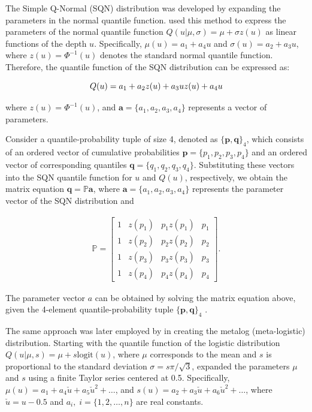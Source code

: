 \documentclass[
  fleqn,
  deca,
  blindrev
]{informs4}
\begin{document}
The Simple Q-Normal (SQN) distribution was developed by expanding the
parameters in the normal quantile function.
\citet{keelin2011QuantileParameterizedDistributions} used this method to
express the parameters of the normal quantile function
\(Q(u\vert\mu,\sigma)=\mu+\sigma z(u)\) as linear functions of the depth
\(u\). Specifically, \(\mu(u)=a_1+a_4u\) and \(\sigma(u)=a_2+a_3u\),
where \(z(u)=\Phi^{-1}(u)\) denotes the standard normal quantile
function. Therefore, the quantile function of the SQN distribution can
be expressed as:

\[
Q(u)= a_1+a_2z(u)+a_3uz(u)+a_4u\\
\]

where \(z(u)=\Phi^{-1}(u)\), and \(\mathbf{a}=\{a_1,a_2,a_3, a_4\}\)
represents a vector of parameters.

Consider a quantile-probability tuple of size 4, denoted as
\(\{\mathbf{p}, \mathbf{q}\}_4\), which consists of an ordered vector of
cumulative probabilities \(\mathbf{p}=\{p_1,p_2,p_3, p_4\}\) and an
ordered vector of corresponding quantiles
\(\mathbf{q}=\{q_1,q_2,q_3, q_4\}\). Substituting these vectors into the
SQN quantile function for \(u\) and \(Q(u)\), respectively, we obtain
the matrix equation \(\mathbf{q}=\mathbb P\mathbf{a}\), where
\(\mathbf{a}=\{a_1, a_2, a_3, a_4\}\) represents the parameter vector of
the SQN distribution and

\[
\begin{gathered}
\mathbb P=\begin{bmatrix} 1 & z(p_1) & p_1z(p_1) & p_1\\
                1 & z(p_2) & p_2z(p_2) & p_2\\
                1 & z(p_3) & p_3z(p_3) & p_3\\
                1 & z(p_4) & p_4z(p_4) & p_4\end{bmatrix}.
\end{gathered}
\]

The parameter vector \(a\) can be obtained by solving the matrix
equation above, given the 4-element quantile-probability tuple
\(\{\mathbf{p}, \mathbf{q}\}_4\)
\citep{keelin2011QuantileParameterizedDistributions, perepolkin2024HybridElicitationQuantileparametrized}.

The same approach was later employed by
\citet{keelin2016MetalogDistributions} in creating the metalog
(meta-logistic) distribution. Starting with the quantile function of the
logistic distribution \(Q(u\vert\mu,s)=\mu+s\text{logit}(u)\), where
\(\mu\) corresponds to the mean and \(s\) is proportional to the
standard deviation \(\sigma=s\pi/\sqrt3\),
\citet{keelin2016MetalogDistributions} expanded the parameters \(\mu\)
and \(s\) using a finite Taylor series centered at 0.5. Specifically,
\(\mu(u)=a_1+a_4\check{u}+a_5\check{u}^2+\dots\), and
\(s(u)=a_2+a_3\check{u}+a_6\check{u}^2+\dots\), where
\(\check{u}=u-0.5\) and \(a_i, \; i = \{1,2,\dots,n\}\) are real
constants.
\end{document}

